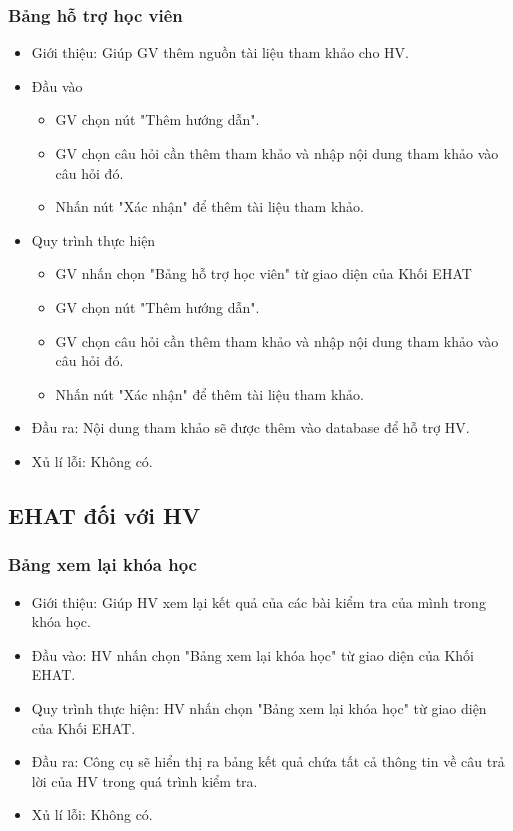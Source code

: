 \subsubsection{Bảng hỗ trợ học viên}
\begin{itemize}
	\item Giới thiệu: Giúp GV thêm nguồn tài liệu tham khảo cho HV.
	\item Đầu vào
	\begin{itemize}
		\item GV chọn nút "Thêm hướng dẫn".
		\item GV chọn câu hỏi cần thêm tham khảo và nhập nội dung tham khảo vào câu hỏi đó.
		\item Nhấn nút "Xác nhận" để thêm tài liệu tham khảo.
	\end{itemize}
	\item Quy trình thực hiện
	\begin{itemize}
		\item GV nhấn chọn "Bảng hỗ trợ học viên" từ giao diện của Khối EHAT
		\item GV chọn nút "Thêm hướng dẫn".
		\item GV chọn câu hỏi cần thêm tham khảo và nhập nội dung tham khảo vào câu hỏi đó.
		\item Nhấn nút "Xác nhận" để thêm tài liệu tham khảo.
	\end{itemize}
	\item Đầu ra: Nội dung tham khảo sẽ được thêm vào database để hỗ trợ HV.
	\item Xủ lí lỗi: Không có.
\end{itemize}

\subsection{EHAT đối với HV}
\subsubsection{Bảng xem lại khóa học}
\begin{itemize}
	\item Giới thiệu: Giúp HV xem lại kết quả của các bài kiểm tra của mình trong khóa học.
	\item Đầu vào: HV nhấn chọn "Bảng xem lại khóa học" từ giao diện của Khối EHAT.
	\item Quy trình thực hiện: HV nhấn chọn "Bảng xem lại khóa học" từ giao diện của Khối EHAT.
	\item Đầu ra: Công cụ sẽ hiển thị ra bảng kết quả chứa tất cả thông tin về câu trả lời của HV trong quá trình kiểm tra.
	\item Xủ lí lỗi: Không có.
\end{itemize}
